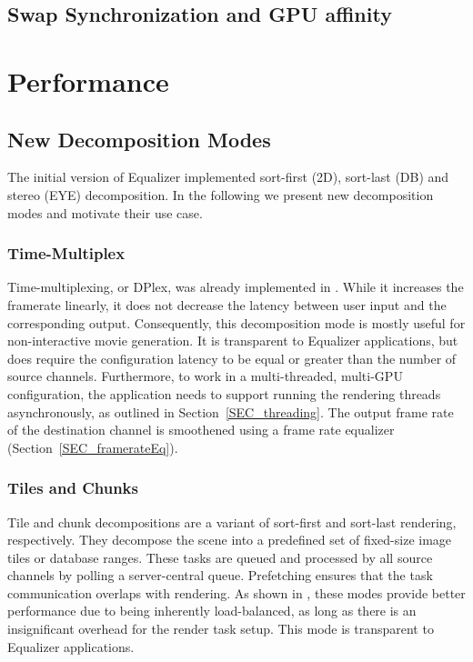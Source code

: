 \documentclass[journal]{vgtc}                %
\newcommand{\sref}[1]{Section~\ref{#1}}
\begin{document}
\subsection{Swap Synchronization and GPU affinity}

\section{Performance}

\subsection{New Decomposition Modes}

The initial version of Equalizer implemented sort-first (2D), sort-last (DB) and
stereo (EYE) decomposition. In the following we present new decomposition modes
and motivate their use case.

\subsubsection{Time-Multiplex}

Time-multiplexing, or DPlex, was already implemented in \cite{BRE:05}. While it
increases the framerate linearly, it does not decrease the latency between user
input and the corresponding output. Consequently, this decomposition mode is
mostly useful for non-interactive movie generation. It is transparent to
Equalizer applications, but does require the configuration latency to be equal
or greater than the number of source channels. Furthermore, to work in a
multi-threaded, multi-GPU configuration, the application needs to support
running the rendering threads asynchronously, as outlined in
\sref{SEC_threading}. The output frame rate of the destination channel is
smoothened using a frame rate equalizer (\sref{SEC_framerateEq}).

\subsubsection{Tiles and Chunks}

Tile and chunk decompositions are a variant of sort-first and sort-last
rendering, respectively. They decompose the scene into a predefined set of
fixed-size image tiles or database ranges. These tasks are queued and processed
by all source channels by polling a server-central queue. Prefetching ensures
that the task communication overlaps with rendering. As shown in \cite{SPEP:16},
these modes provide better performance due to being inherently load-balanced, as
long as there is an insignificant overhead for the render task setup. This mode
is transparent to Equalizer applications.
\end{document}
